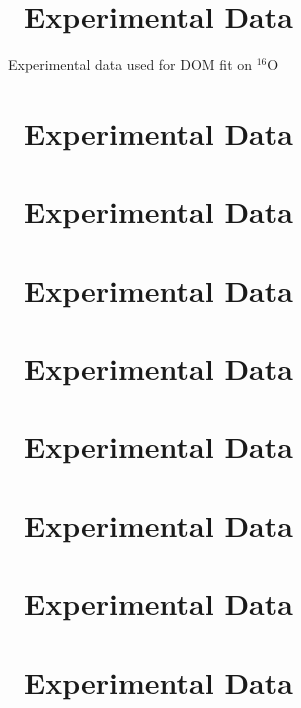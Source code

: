 \label{DOMDatasets}
\section{\oSix\ Experimental Data}

\begin{table*}[ht]
    \caption{Experimental data used for DOM fit on $^{16}$O}
    \label{tab:O16ExpData}
    \label{O16Data}
    \begin{center}
        
    \end{center}
\end{table*}

\section{\oEight\ Experimental Data}

\section{\caForty\ Experimental Data}

\section{\caEight\ Experimental Data}

\section{\niEight\ Experimental Data}

\section{\niFour\ Experimental Data}

\section{\snTwelve\ Experimental Data}

\section{\snFour\ Experimental Data}

\section{\pbEight\ Experimental Data}
